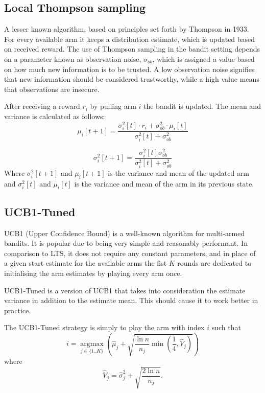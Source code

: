 \subsection{Local Thompson sampling}
A lesser known algorithm, based on principles set forth by Thompson in 1933. 
For every available arm it keeps a distribution estimate, which is 
updated based on received reward. The use of Thompson sampling in the bandit 
setting depends on a parameter known as observation noise, $\sigma_{ob}$, which 
is assigned a value based on how much new information is to be trusted. A low 
observation noise signifies that new information should be considered 
trustworthy, while a high value means that observations are insecure. 

After receiving a reward $r_i$ by pulling arm $i$ the bandit is updated. The mean and variance
is calculated as follows:
\begin{displaymath}
\mu_i [t + 1] = \frac{\sigma_i^2 [t] \cdot r_i + \sigma_{ob}^2 \cdot \mu_i [t]}{\sigma_i^2 [t] + \sigma_{ob}^2}
\end{displaymath}

\begin{displaymath}
\sigma_i^2 [t + 1] = \frac{\sigma_i^2 [t] \sigma_{ob}^2}{\sigma_i^2 [t] + \sigma_{ob}^2}
\end{displaymath}
Where $\sigma_i^2 [t + 1]$ and $\mu_i [t + 1]$ is the variance and mean of the updated arm and
$\sigma_i^2 [t]$ and $\mu_i [t]$ is the variance and mean of the arm in its previous state.

\subsection{UCB1-Tuned}
UCB1 \cite{Auer02UCB1} (Upper Confidence Bound) is a well-known algorithm for multi-armed bandits.
It is popular due to being very simple and reasonably performant. In comparison 
to LTS, it does not require any constant parameters, and in place of a given 
start estimate for the available arms the fist $K$ rounds are dedicated to 
initialising the arm estimates by playing every arm once.

UCB1-Tuned is a version of UCB1 that takes into consideration the estimate variance in addition to the estimate mean. This should cause it to work better in practice.

The UCB1-Tuned strategy is simply to play the arm with index $i$ such that
\begin{displaymath}
    i = \operatorname*{argmax}_{j \in \{ 1..K \}} \left(\hat{\mu}_j + 
    \sqrt{\frac{\ln{n}}{n_j} \min(\frac{1}{4},\hat{V}_j)}\right)
\end{displaymath}
where 
\begin{displaymath}
    \hat{V}_j = \hat{\sigma}_j^2 + \sqrt{\frac{2\ln{n}}{n_j}}\text{.}
\end{displaymath}

